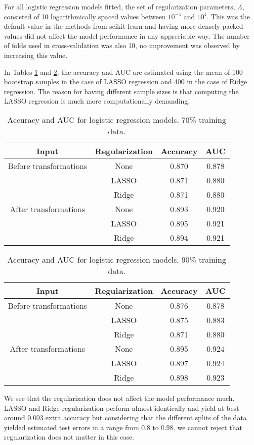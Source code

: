 \documentclass[../../project.tex]{subfiles}
\begin{document}
	For all logistic regression models fitted, the set of regularization parameters, $\Lambda$, consisted of 10 logarithmically spaced values between $10^{-4}$ and $10^4$. This was the default value in the methods from scikit learn and having more densely packed values did not affect the model performance in any appreciable way. The number of folds used in cross-validation was also 10, no improvement was observed by increasing this value.
	
	In Tables \ref{tab:logreg_table_70} and \ref{tab:logreg_table_90}, the accuracy and AUC are estimated using the mean of 100 bootstrap samples in the case of LASSO regression and 400 in the case of Ridge regression. The reason for having different sample sizes is that computing the LASSO regression is much more computationally demanding.
	
	\begin{table}[h!]
		\centering
		\begin{tabular}{cccc}
			Input & Regularization & Accuracy & AUC \\
			\midrule
			Before transformations & None & 0.870 & 0.878 \\
			& LASSO & 0.871 & 0.880 \\
			& Ridge & 0.871 & 0.880 \\
			\midrule
			After transformations & None & 0.893 & 0.920 \\
			& LASSO & 0.895 & 0.921 \\
			& Ridge & 0.894 & 0.921 \\
		\end{tabular}
		\caption{Accuracy and AUC for logistic regression models. 70\% training data.}
		\label{tab:logreg_table_70}
	\end{table}
	
	\begin{table}[h!]
		\centering
		\begin{tabular}{cccc}
			Input & Regularization & Accuracy & AUC \\
			\midrule
			Before transformations & None & 0.876 & 0.878 \\
			& LASSO & 0.875 & 0.883 \\
			& Ridge & 0.871 & 0.880 \\
			\midrule
			After transformations & None & 0.895 & 0.924 \\
			& LASSO & 0.897 & 0.924 \\
			& Ridge & 0.898 & 0.923 \\
		\end{tabular}
		\caption{Accuracy and AUC for logistic regression models. 90\% training data.}
		\label{tab:logreg_table_90}
	\end{table}
	
	We see that the regularization does not affect the model performance much. LASSO and Ridge regularization perform almost identically and yield at best around 0.003 extra accuracy but considering that the different splits of the data yielded estimated test errors in a range from 0.8 to 0.98, we cannot reject that regularization does not matter in this case.
\end{document}
